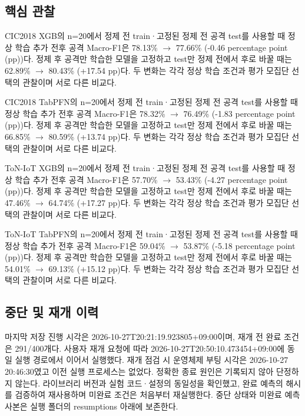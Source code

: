 \subsection{핵심 관찰}
CIC2018 XGB의 n=\allowbreak{}20에서 정제 전 train·고정된 정제 전 공격 test를 사용할 때 정상 학습 추가 전후 공격 Macro-F1은 78.13\%  \ensuremath{\rightarrow}  77.66\% (-0.46 percentage point (pp))다. 정제 후 공격만 학습한 모델을 고정하고 test만 정제 전에서 후로 바꿀 때는 62.89\%  \ensuremath{\rightarrow}  80.43\% (+\allowbreak{}17.54 pp)다. 두 변화는 각각 정상 학습 조건과 평가 모집단 선택의 관찰이며 서로 다른 비교다.

CIC2018 TabPFN의 n=\allowbreak{}20에서 정제 전 train·고정된 정제 전 공격 test를 사용할 때 정상 학습 추가 전후 공격 Macro-F1은 78.32\%  \ensuremath{\rightarrow}  76.49\% (-1.83 percentage point (pp))다. 정제 후 공격만 학습한 모델을 고정하고 test만 정제 전에서 후로 바꿀 때는 66.85\%  \ensuremath{\rightarrow}  80.59\% (+\allowbreak{}13.74 pp)다. 두 변화는 각각 정상 학습 조건과 평가 모집단 선택의 관찰이며 서로 다른 비교다.

ToN-IoT XGB의 n=\allowbreak{}20에서 정제 전 train·고정된 정제 전 공격 test를 사용할 때 정상 학습 추가 전후 공격 Macro-F1은 57.70\%  \ensuremath{\rightarrow}  53.43\% (-4.27 percentage point (pp))다. 정제 후 공격만 학습한 모델을 고정하고 test만 정제 전에서 후로 바꿀 때는 47.46\%  \ensuremath{\rightarrow}  64.74\% (+\allowbreak{}17.27 pp)다. 두 변화는 각각 정상 학습 조건과 평가 모집단 선택의 관찰이며 서로 다른 비교다.

ToN-IoT TabPFN의 n=\allowbreak{}20에서 정제 전 train·고정된 정제 전 공격 test를 사용할 때 정상 학습 추가 전후 공격 Macro-F1은 59.04\%  \ensuremath{\rightarrow}  53.87\% (-5.18 percentage point (pp))다. 정제 후 공격만 학습한 모델을 고정하고 test만 정제 전에서 후로 바꿀 때는 54.01\%  \ensuremath{\rightarrow}  69.13\% (+\allowbreak{}15.12 pp)다. 두 변화는 각각 정상 학습 조건과 평가 모집단 선택의 관찰이며 서로 다른 비교다.

\subsection{중단 및 재개 이력}
마지막 저장 진행 시각은 2026-10-27T20:21:19.923805+\allowbreak{}09:00이며, 재개 전 완료 조건은 291/\allowbreak{}400개다. 사용자 재개 요청에 따라 2026-10-27T20:50:10.473454+\allowbreak{}09:00에 동일 실행 경로에서 이어서 실행했다. 재개 점검 시 운영체제 부팅 시각은 2026-10-27 20:46:30였고 이전 실행 프로세스는 없었다. 정확한 종료 원인은 기록되지 않아 단정하지 않는다. 라이브러리 버전과 실험 코드·설정의 동일성을 확인했고, 완료 예측의 해시를 검증하여 재사용하며 미완료 조건은 처음부터 재실행한다. 중단 상태와 미완료 예측 사본은 실행 폴더의 resumptions 아래에 보존한다.


